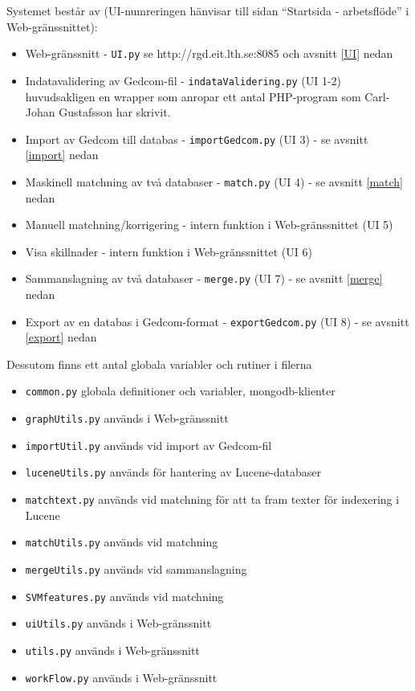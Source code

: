 \documentclass[swedish,11pt]{article}
\begin{document}
Systemet består av (UI-numreringen hänvisar till sidan ``Startsida -
arbetsflöde'' i Web-gränssnittet):
\begin{itemize}
\item Web-gränssnitt - \verb+UI.py+  se http://rgd.eit.lth.se:8085 och avsnitt \ref{UI} nedan
\item Indatavalidering av Gedcom-fil - \verb+indataValidering.py+
  (UI 1-2)\\
huvudsakligen en wrapper som anropar ett antal PHP-program som
Carl-Johan Gustafsson har skrivit.
\item Import av Gedcom till databas - \verb+importGedcom.py+ (UI 3) - se
  avsnitt \ref{import} nedan
\item Maskinell matchning av två databaser - \verb+match.py+ (UI 4) - se
  avsnitt \ref{match} nedan
\item Manuell matchning/korrigering - intern funktion i
  Web-gränssnittet (UI 5)
\item Visa skillnader - intern funktion i
  Web-gränssnittet (UI 6)
\item Sammanslagning av två databaser - \verb+merge.py+ (UI 7) - se
  avsnitt \ref{merge} nedan
\item Export av en databas i Gedcom-format - \verb+exportGedcom.py+
  (UI 8) - se avsnitt \ref{export} nedan
\end{itemize}

Dessutom finns ett antal globala variabler och rutiner i filerna
\begin{itemize}
\item \verb+common.py+ globala definitioner och variabler, mongodb-klienter
\item \verb+graphUtils.py+ används i Web-gränssnitt 
\item \verb+importUtil.py+ används vid import av Gedcom-fil
\item \verb+luceneUtils.py+ används för hantering av Lucene-databaser
\item \verb+matchtext.py+ används vid matchning för att ta fram texter
  för indexering i Lucene
\item \verb+matchUtils.py+ används vid matchning
\item \verb+mergeUtils.py+ används vid sammanslagning
\item \verb+SVMfeatures.py+ används vid matchning
\item \verb+uiUtils.py+ används i Web-gränssnitt 
\item \verb+utils.py+ används i Web-gränssnitt 
\item \verb+workFlow.py+ används i Web-gränssnitt 
\end{itemize}
\end{document}
